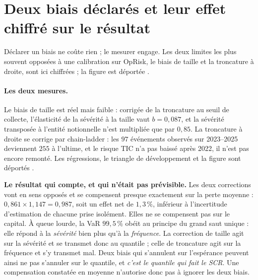 \section{Deux biais déclarés et leur effet chiffré sur le résultat}

Déclarer un biais ne coûte rien ; le mesurer engage. Les deux limites les plus souvent
opposées à une calibration sur OpRisk, le biais de taille et la troncature à droite, sont
ici chiffrées ; la figure est déportée \matcomp.

\paragraph{Les deux mesures.} Le biais de taille est réel mais faible : corrigée de la troncature
au seuil de collecte, l'élasticité de la sévérité à la taille vaut $b=0{,}087$, et la sévérité
transposée à l'entité notionnelle n'est multipliée que par $0{,}85$. La troncature à droite se
corrige par chain-ladder : les $97$ événements observés sur 2023--2025 deviennent $255$ à
l'ultime, et le risque TIC n'a pas baissé après 2022, il n'est pas encore remonté. Les
régressions, le triangle de développement et la figure sont déportés \matcomp.

\begin{cle}
\textbf{Le résultat qui compte, et qui n'était pas prévisible.} Les deux corrections vont en
sens opposés et se compensent presque exactement sur la perte moyenne :
$0{,}861\times1{,}147=0{,}987$, soit un effet net de $1{,}3\,\%$, inférieur à l'incertitude
d'estimation de chacune prise isolément. Elles ne se compensent pas sur le capital.
À queue lourde, la VaR $99{,}5\,\%$ obéit au principe du grand saut unique : elle répond à la
\emph{sévérité} bien plus qu'à la \emph{fréquence}. La correction de taille agit sur la
sévérité et se transmet donc au quantile ; celle de troncature agit sur la fréquence et s'y
transmet mal. Deux biais qui s'annulent sur l'espérance peuvent ainsi ne pas s'annuler sur le
quantile, et \emph{c'est le quantile qui fait le SCR}. Une compensation constatée en moyenne
n'autorise donc pas à ignorer les deux biais.
\end{cle}


